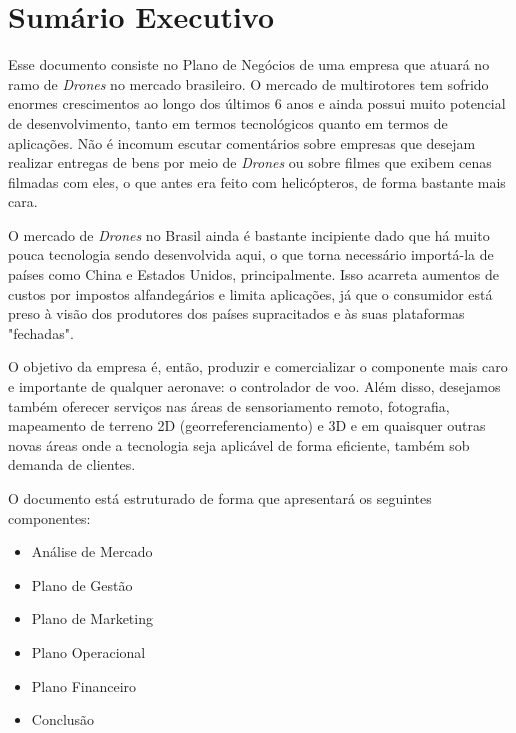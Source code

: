 \section{Sumário Executivo}

Esse documento consiste no Plano de Negócios de uma empresa que atuará
no ramo de \emph{Drones} no mercado brasileiro. O mercado de multirotores
tem sofrido enormes crescimentos ao longo dos últimos 6 anos e ainda possui
muito potencial de desenvolvimento, tanto em termos tecnológicos quanto em
termos de aplicações. Não é incomum escutar comentários sobre empresas que
desejam realizar entregas de bens por meio de \emph{Drones} ou sobre filmes
que exibem cenas filmadas com eles, o que antes era feito com helicópteros,
de forma bastante mais cara.

O mercado de \emph{Drones} no Brasil ainda é bastante incipiente dado que
há muito pouca tecnologia sendo desenvolvida aqui, o que torna necessário
importá-la de países como China e Estados Unidos, principalmente.
Isso acarreta aumentos de custos por impostos alfandegários e limita
aplicações, já que o consumidor está preso à visão dos produtores dos países
supracitados e às suas plataformas "fechadas".

O objetivo da empresa é, então, produzir e comercializar o componente mais caro 
e importante de qualquer aeronave: o controlador de voo. Além disso, desejamos
também oferecer serviços nas áreas de sensoriamento remoto, fotografia, mapeamento
de terreno 2D (georreferenciamento) e 3D e em quaisquer outras novas áreas onde
a tecnologia seja aplicável de forma eficiente, também sob demanda de clientes.

O documento está estruturado de forma que apresentará os seguintes componentes:

\begin{itemize}
	\item Análise de Mercado
	\item Plano de Gestão
	\item Plano de Marketing
	\item Plano Operacional
	\item Plano Financeiro
	\item Conclusão
\end{itemize}


